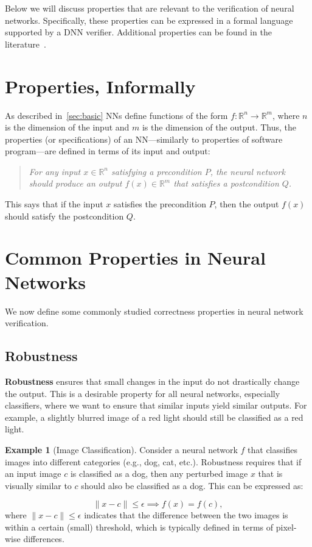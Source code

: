\documentclass[oneside,11pt,dvipsnames]{book}
\numberwithin{equation}{section}
\theoremstyle{definition}
\newtheorem{example}{Example}[section]
\theoremstyle{remark}
\begin{document}
Below we will discuss properties that are relevant to the verification of neural networks. Specifically, these properties can be 
expressed in a formal language supported by a DNN verifier. Additional properties can be found in the literature~\cite{seshia2018formal}.

\section{Properties, Informally}

As described in~\autoref{sec:basic} NNs define functions of the form $f: \mathbb{R}^{n} \to \mathbb{R}^{m}$, 
where $n$ is the dimension of the input and $m$ is the dimension of the output. Thus, the properties (or specifications) of an NN---similarly to properties of software program---are defined in terms of its input and output:

\begin{quote}
\textit{For any input $x \in \mathbb{R}^{n}$ satisfying a precondition $P$, the neural network should produce an output $f(x) \in \mathbb{R}^{m}$ that satisfies a postcondition $Q$.}
\end{quote}

This says that if the input $x$ satisfies the precondition $P$, then the output $f(x)$ should satisfy the postcondition $Q$.






\section{Common Properties in Neural Networks}

We now define some commonly studied correctness properties in neural network verification.

\subsection{Robustness}

\textbf{Robustness} ensures that small changes in the input do not drastically change the output. This is a desirable property for all neural networks, especially classifiers, where we want to ensure that similar inputs yield similar outputs. For example, a slightly blurred image of a red light should still be classified as a red light.

\begin{example}[Image Classification]
Consider a neural network $f$ that classifies images into different categories (e.g., dog, cat, etc.). Robustness requires that if an input image $c$ is classified as a dog, then any perturbed image $x$ that is visually similar to $c$ should also be classified as a dog. This can be expressed as:

\[
\|x - c\| \leq \epsilon \implies f(x) = f(c), 
\]
where $\|x - c\| \leq \epsilon$ indicates that the difference between the two images is within a certain (small) threshold, which is typically defined in terms of pixel-wise differences.
\end{example}
\end{document}
